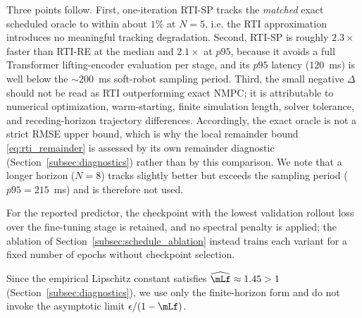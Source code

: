 Three points follow. First, one-iteration RTI-SP tracks the \emph{matched} exact scheduled oracle to within about $1\%$ at $N=5$, i.e. the RTI approximation introduces no meaningful tracking degradation. Second, RTI-SP is roughly $2.3\times$ faster than RTI-RE at the median and $2.1\times$ at $p95$, because it avoids a full Transformer lifting-encoder evaluation per stage, and its $p95$ latency ($120$~ms) is well below the $\sim200$~ms soft-robot sampling period. Third, the small negative $\Delta$ should not be read as RTI outperforming exact NMPC; it is attributable to numerical optimization, warm-starting, finite simulation length, solver tolerance, and receding-horizon trajectory differences. Accordingly, the exact oracle is not a strict RMSE upper bound, which is why the local remainder bound \eqref{eq:rti_remainder} is assessed by its own remainder diagnostic (Section~\ref{subsec:diagnostics}) rather than by this comparison. We note that a longer horizon ($N=8$) tracks slightly better but exceeds the sampling period ($p95=215$~ms) and is therefore not used.


For the reported predictor, the checkpoint with the lowest validation rollout loss over the fine-tuning stage is retained, and no spectral penalty is applied; the ablation of Section~\ref{subsec:schedule_ablation} instead trains each variant for a fixed number of epochs without checkpoint selection.


Since the empirical Lipschitz constant satisfies $\widehat{\mLf}\approx1.45>1$ (Section~\ref{subsec:diagnostics}), we use only the finite-horizon form and do not invoke the asymptotic limit $\epsilon/(1-\mLf)$.


